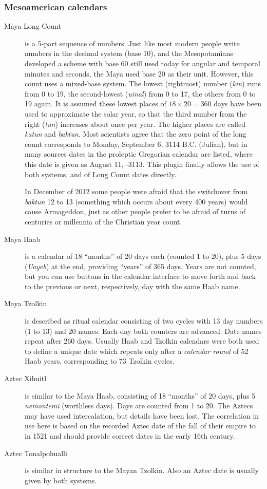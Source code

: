 \subsubsection{Mesoamerican calendars}
\begin{description}
\item[Maya Long Count] is a 5-part sequence of numbers. Just like most
  modern people write numbers in the decimal system (base 10), and the
  Mesopotamians developed a scheme with base 60 still used today for
  angular and temporal minutes and seconds, the Maya used base 20 as their
  unit. However, this count uses a mixed-base system. The lowest
  (rightmost) number (\emph{kin}) runs from 0 to 19, the second-lowest
  (\emph{uinal}) from 0 to 17, the others from 0 to 19 again. It is
  assumed these lowest places of $18\times20=360$ days have been used
  to approximate the solar year, so that the third number from the
  right (\emph{tun}) increases about once per year. The higher places
  are called \emph{katun} and \emph{baktun}. Most scientists agree
  that the zero point of the long count corresponds to Monday,
  September 6, 3114 B.C. (Julian), but in many sources dates in the
  proleptic Gregorian calendar are listed, where this date is given as
  August 11, -3113. This plugin finally allows the use of both
  systems, and of Long Count dates directly.

  In December of 2012 some people were afraid that the switchover from
  \emph{baktun} 12 to 13 (something which occurs about every 400
  years) would cause Armageddon, just as other people prefer to be
  afraid of turns of centuries or millennia of the Christian year
  count.
\item[Maya Haab] is a calendar of 18 ``months'' of 20 days each
  (counted 1 to 20), plus 5 days (\emph{Uayeb}) at the end, providing
  ``years'' of 365 days. Years are not counted, but you can use
  buttons in the calendar interface to move forth and back to the
  previous or next, respectively, day with the same Haab name.
\item[Maya Tzolkin] is described as ritual calendar consisting of two
  cycles with 13 day numbers (1 to 13) and 20 names. Each day both
  counters are advanced. Date names repeat after 260 days. Usually
  Haab and Tzolkin calendars were both used to define a unique date
  which repeats only after a \emph{calendar round} of 52 Haab years,
  corresponding to 73 Tzolkin cycles.
\item[Aztec Xihuitl] is similar to the Maya Haab, consisting of 18
  ``months'' of 20 days, plus 5 \emph{nemontemi} (worthless
  days). Days are counted from 1 to 20. The Aztecs may have used
  intercalation, but details have been lost. The correlation in use
  here is based on the recorded Aztec date of the fall of their empire
  to  in 1521 and should provide correct dates in the
  early 16th century.
\item[Aztec Tonalpohualli] is similar in structure to the Mayan
  Tzolkin. Also an Aztec date is usually given by both systems.
\end{description}

